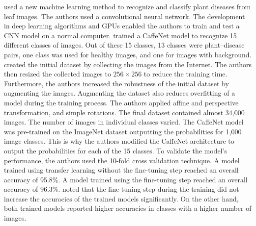 \documentclass{BachelorBUI}
\begin{document}
        \textcite{Sladojevic:2016} used a new machine learning method to recognize and classify plant diseases from leaf images. The authors used a convolutional neural network. The development in deep learning algorithms and GPUs enabled the authors to train and test a CNN model on a normal computer. \textcite{Sladojevic:2016} trained a CaffeNet model to recognize 15 different classes of images. Out of these 15 classes, 13 classes were plant--disease pairs, one class was used for healthy images, and one for images with background. \textcite{Sladojevic:2016} created the initial dataset by collecting the images from the Internet. The authors then resized the collected images to $256 \times 256$ to reduce the training time. Furthermore, the authors increased the robustness of the initial dataset by augmenting the images. Augmenting the dataset also reduces overfitting of a model during the training process. The authors applied affine and perspective transformation, and simple rotations. The final dataset contained almost 34,000 images. The number of images in individual classes varied. The CaffeNet model was pre-trained on the ImageNet dataset outputting the probabilities for 1,000 image classes. This is why the authors modified the CaffeNet architecture to output the probabilities for each of the 15 classes. To validate the model's performance, the authors used the 10-fold cross validation technique. A model trained using transfer learning without the fine-tuning step reached an overall accuracy of 95.8\%. A model trained using the fine-tuning step reached an overall accuracy of 96.3\%. \textcite{Sladojevic:2016} noted that the fine-tuning step during the training did not increase the accuracies of the trained models significantly. On the other hand, both trained models reported higher accuracies in classes with a higher number of images.
\end{document}
